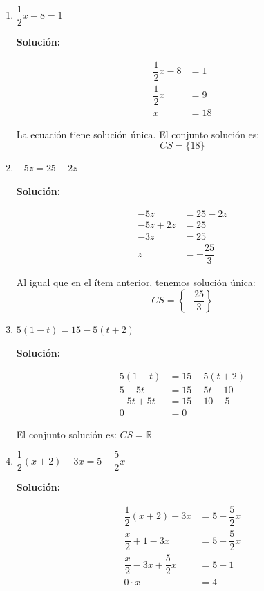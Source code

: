 \documentclass[12pt]{article}
\newcommand{\solucion}{%
    \vspace{0.8em}%
    \textbf{Solución:}%
}
\begin{document}
\begin{enumerate}[label=\alph*.-]
    \item $\dfrac{1}{2}x - 8 = 1$

    \solucion

    \begin{align*}
    \dfrac{1}{2}x - 8 &= 1 \\[0.3em]
    \dfrac{1}{2}x &= 9 \\[0.3em]
    x &= 18
    \end{align*}

    La ecuación tiene solución única. El conjunto solución es:
    \[
    \boxed{CS = \{18\}}
    \]

    \item $-5z = 25 - 2z$

    \solucion

    \begin{align*}
    -5z &= 25 - 2z \\[0.3em]
    -5z + 2z &= 25 \\[0.3em]
    -3z &= 25 \\[0.3em]
    z &= -\dfrac{25}{3}
    \end{align*}

    Al igual que en el ítem anterior, tenemos solución única:
    \[
    \boxed{CS = \left\{-\dfrac{25}{3}\right\}}
    \]

    \newpage
    \item $5(1 - t) = 15 - 5(t + 2)$

    \solucion

    \begin{align*}
    5(1-t) &= 15 - 5(t+2) \\[0.3em]
    5 - 5t &= 15 - 5t - 10 \\[0.3em]
    -5t + 5t &= 15 - 10 - 5 \\[0.3em]
    0 &= 0
    \end{align*}

    El conjunto solución es: $\boxed{CS = \mathbb{R}}$

    \item $\dfrac{1}{2}(x + 2) - 3x = 5 - \dfrac{5}{2}x$

    \solucion

    \begin{align*}
    \dfrac{1}{2}(x+2) - 3x &= 5 - \dfrac{5}{2}x \\[0.3em]
    \dfrac{x}{2} + 1 - 3x &= 5 - \dfrac{5}{2}x \\[0.3em]
    \dfrac{x}{2} - 3x + \dfrac{5}{2}x &= 5 - 1 \\[0.3em]
    0 \cdot x &= 4
    \end{align*}


\end{enumerate}
\end{document}
